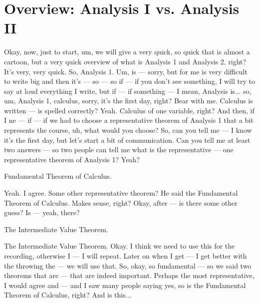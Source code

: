 \section{Overview: Analysis I vs. Analysis II}

\begin{spoken-clean}[00:05:07 - 00:07:20]
Okay, now, just to start, um, we will give a very quick, so quick that is almost a cartoon, but a very quick overview of what is Analysis 1 and Analysis 2, right? It's very, very quick.  So, Analysis 1. Um, is — sorry, but for me is very difficult to write big and then it's — so — so if — if you don't see something, I will try to say at loud everything I write, but if — if something — I mean, Analysis is... so, um, Analysis 1, calculus, sorry, it's the first day, right? Bear with me. Calculus is written — is spelled correctly? Yeah. Calculus of one variable, right? And then, if I ne — if — if we had to choose a representative theorem of Analysis 1 that a bit represents the course, uh, what would you choose? So, can you tell me — I know it's the first day, but let's start a bit of communication. Can you tell me at least two answers — so two people can tell me what is the representative — one representative theorem of Analysis 1? Yeah?
\end{spoken-clean}

\begin{student-interaction}
Fundamental Theorem of Calculus.
\end{student-interaction}

\begin{spoken-clean}[continued]
Yeah. I agree. Some other representative theorem? He said the Fundamental Theorem of Calculus. Makes sense, right? Okay, after — is there some other guess? Is — yeah, there?
\end{spoken-clean}

\begin{student-interaction}
The Intermediate Value Theorem.
\end{student-interaction}

\begin{spoken-clean}[continued]
The Intermediate Value Theorem. Okay. I think we need to use this for the recording, otherwise I — I will repeat.  Later on when I get — I get better with the throwing the — we will use that. So, okay, so fundamental — so we said two theorems that are — that are indeed important. Perhaps the most representative, I would agree and — and I saw many people saying yes, so is the Fundamental Theorem of Calculus, right? And is this... 
\end{spoken-clean}

